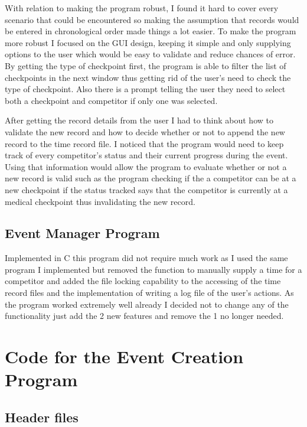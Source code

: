 \documentclass[a4paper,12pt]{article}
\begin{document}
\vspace{5mm}
\noindent With relation to making the program robust, I found it hard to cover every scenario that could be encountered so making the assumption that records would be entered in chronological order made things a lot easier. To make the program more robust I focused on the GUI design, keeping it simple and only supplying options to the user which would be easy to validate and reduce chances of error. By getting the type of checkpoint first, the program is able to filter the list of checkpoints in the next window thus getting rid of the user's need to check the type of checkpoint. Also there is a prompt telling the user they need to select both a checkpoint and competitor if only one was selected.

\vspace{5mm}
\noindent After getting the record details from the user I had to think about how to validate the new record and how to decide whether or not to append the new record to the time record file. I noticed that the program would need to keep track of every competitor's status and their current progress during the event. Using that information would allow the program to evaluate whether or not a new record is valid such as the program checking if the a competitor can be at a new checkpoint if the status tracked says that the competitor is currently at a medical checkpoint thus invalidating the new record.

\subsection{Event Manager Program}
\noindent Implemented in C this program did not require much work as I used the same program I implemented but removed the function to manually supply a time for a competitor and added the file locking capability to the accessing of the time record files and the implementation of writing a log file of the user's actions. As the program worked extremely well already I decided not to change any of the functionality just add the 2 new features and remove the 1 no longer needed.

\section{Code for the Event Creation Program}
\subsection{Header files}




\end{document}
